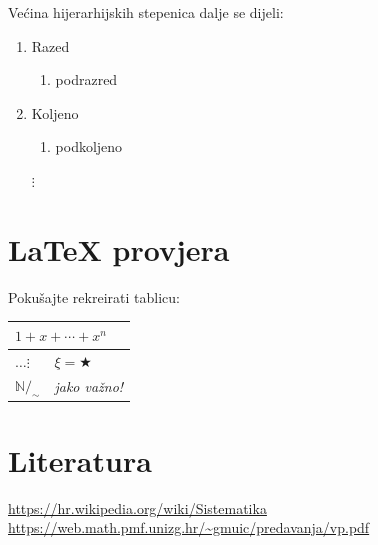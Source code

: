 \documentclass[12pt]{scrartcl}
\begin{document}
Većina hijerarhijskih stepenica dalje se dijeli:
\begin{enumerate}
\item Razed
    \begin{enumerate}
        \item podrazred
    \end{enumerate}
\item Koljeno
\begin{enumerate}
    \item podkoljeno
\end{enumerate}
\item [$\vdots$]
\end{enumerate}

\section{\LaTeX{} provjera}
\begin{zadatak}
Pokušajte rekreirati tablicu: 
\end{zadatak}
\begin{table}[h]
\begin{tabular}{|l|l|l|l|}
\hline
\multicolumn{4}{|l|}{$1+x+\dotsb+x^n$}\\ \hline
\multicolumn{2}{|l|}{$\dotsc \vdots$} & 
\multicolumn{2}{l|}{$\xi = \bigstar$}\\ \hline
$\mathbb N/_\sim$ & \multicolumn{3}{l|}{\emph{jako važno!}} \\ \hline
\end{tabular}
\end{table}

\section{Literatura}
\url{https://hr.wikipedia.org/wiki/Sistematika}\\
\url{https://web.math.pmf.unizg.hr/~gmuic/predavanja/vp.pdf}
\end{document}
